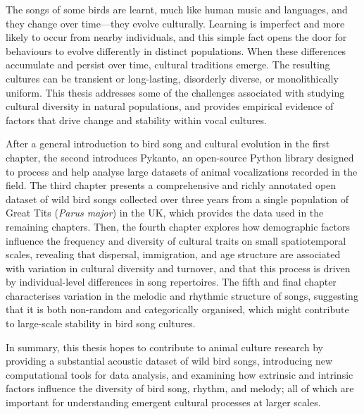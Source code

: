 The songs of some birds are learnt, much like human music and languages, and they change over time---they evolve culturally. Learning is imperfect and more likely to occur from nearby individuals, and this simple fact opens the door for behaviours to evolve differently in distinct populations. When these differences accumulate and persist over time, cultural traditions emerge. The resulting cultures can be transient or long-lasting, disorderly diverse, or monolithically uniform. This thesis addresses some of the challenges associated with studying cultural diversity in natural populations, and provides empirical evidence of factors that drive change and stability within vocal cultures. 

After a general introduction to bird song and cultural evolution in the first chapter, the second introduces Pykanto, an open-source Python library designed to process and help analyse large datasets of animal vocalizations recorded in the field. The third chapter presents a comprehensive and richly annotated open dataset of wild bird songs collected over three years from a single population of Great Tits (\textit{Parus major}) in the UK, which provides the data used in the remaining chapters. Then, the fourth chapter explores how demographic factors influence the frequency and diversity of cultural traits on small spatiotemporal scales, revealing that dispersal, immigration, and age structure are associated with variation in cultural diversity and turnover, and that this process is driven by individual-level differences in song repertoires. The fifth and final chapter characterises variation in the melodic and rhythmic structure of songs, suggesting that it is both non-random and categorically organised, which might contribute to large-scale stability in bird song cultures.

In summary, this thesis hopes to contribute to animal culture research by providing a substantial acoustic dataset of wild bird songs, introducing new computational tools for data analysis, and examining how extrinsic and intrinsic factors influence the diversity of bird song, rhythm, and melody; all of which are important for understanding emergent cultural processes at larger scales.
